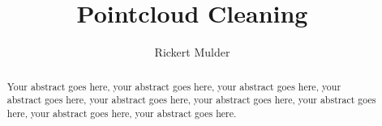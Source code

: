 \documentclass[a4paper,11pt]{report}
\begin{document}
\pagestyle{plain} %
\title{Pointcloud Cleaning}
\author{Rickert Mulder}
\maketitle

\begin{abstract}
Your abstract goes here, your abstract goes here, your abstract goes here, your abstract goes here, your abstract goes here, your abstract goes here, your abstract goes here, your abstract goes here, your abstract goes here. \cite{Bartels2001}
\end{abstract}

\tableofcontents
\newpage











\end{document}
